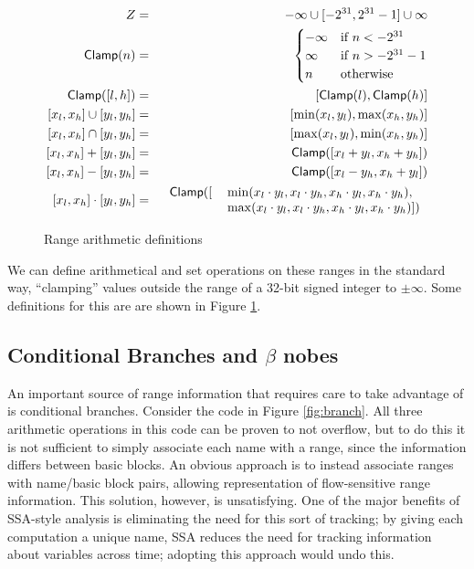 \documentclass{article}
\newcommand{\Clamp}{\mathsf{Clamp}}
\let\x\cdot
\begin{document}
\begin{figure}[ht]
\begin{eqnarray*}
Z &=& {-\infty} \cup [-2^{31}, 2^{31}-1] \cup {\infty} \\
\Clamp(n) &=& \begin{cases}
-\infty &\text{if } n < -2^{31} \\
\infty &\text{if } n > -2^{31}-1 \\
n&\text{otherwise } \\
\end{cases}\\
\Clamp([l, h]) &=& [\Clamp(l), \Clamp(h)] \\
{[x_l, x_h] \cup [y_l, y_h]} &=& [\min(x_l, y_l), \max(x_h, y_h)] \\
{[x_l, x_h] \cap [y_l, y_h]} &=& [\max(x_l, y_l), \min(x_h, y_h)] \\
{[x_l, x_h] + [y_l, y_h]} &=& \Clamp ([x_l + y_l, x_h + y_h]) \\
{[x_l, x_h] - [y_l, y_h]} &=& \Clamp ([x_l - y_h, x_h + y_l]) \\
{[x_l, x_h] \x [y_l, y_h]} &=& 
\begin{tabular}{rl}
$\Clamp ([$&$\min(x_l \x y_l, x_l \x y_h, x_h \x y_l, x_h \x y_h),$\\
&$\max(x_l \x y_l, x_l \x y_h, x_h \x y_l, x_h \x y_h)])$ \\
\end{tabular}
\end{eqnarray*}

\caption{Range arithmetic definitions}
\label{fig:range_arith}
\end{figure}

We can define arithmetical and set operations on these ranges in the
standard way, ``clamping'' values outside the range of a 32-bit signed
integer to $\pm \infty$. Some definitions for this are are shown in
Figure \ref{fig:range_arith}.

\subsection{Conditional Branches and $\beta$ nobes}

An important source of range information that requires care to take
advantage of is conditional branches. Consider the code in Figure
\ref{fig:branch}. All three arithmetic operations in this code can be
proven to not overflow, but to do this it is not sufficient to simply
associate each name with a range, since the information differs
between basic blocks. An obvious approach is to instead associate
ranges with name/basic block pairs, allowing representation of
flow-sensitive range information. This solution, however, is
unsatisfying. One of the major benefits of SSA-style analysis is
eliminating the need for this sort of tracking; by giving each
computation a unique name, SSA reduces the need for tracking
information about variables across time; adopting this approach would
undo this.
\end{document}
